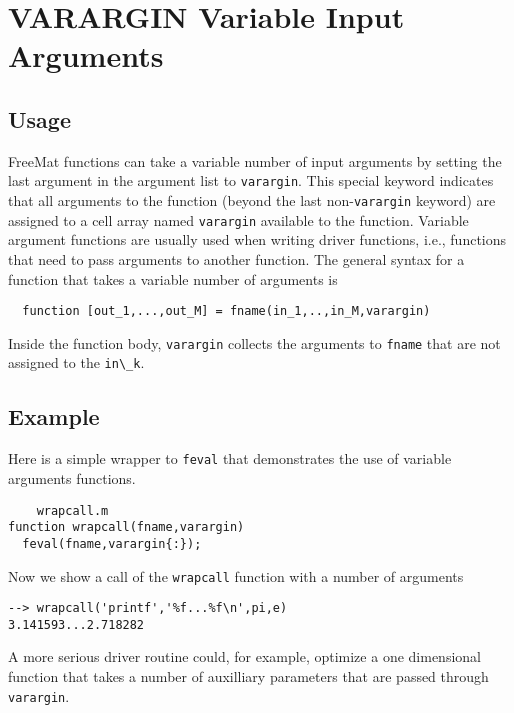 \section{VARARGIN Variable Input Arguments}

\subsection{Usage}

FreeMat functions can take a variable number of input arguments
by setting the last argument in the argument list to \verb|varargin|.
This special keyword indicates that all arguments to the
function (beyond the last non-\verb|varargin| keyword) are assigned
to a cell array named \verb|varargin| available to the function.
Variable argument functions are usually used when writing 
driver functions, i.e., functions that need to pass arguments
to another function.  The general syntax for a function that
takes a variable number of arguments is
\begin{verbatim}
  function [out_1,...,out_M] = fname(in_1,..,in_M,varargin)
\end{verbatim}
Inside the function body, \verb|varargin| collects the arguments 
to \verb|fname| that are not assigned to the \verb|in\_k|.
\subsection{Example}

Here is a simple wrapper to \verb|feval| that demonstrates the
use of variable arguments functions.
\begin{verbatim}
    wrapcall.m
function wrapcall(fname,varargin)
  feval(fname,varargin{:});
\end{verbatim}
Now we show a call of the \verb|wrapcall| function with a number
of arguments
\begin{verbatim}
--> wrapcall('printf','%f...%f\n',pi,e)
3.141593...2.718282
\end{verbatim}
A more serious driver routine could, for example, optimize
a one dimensional function that takes a number of auxilliary
parameters that are passed through \verb|varargin|.
